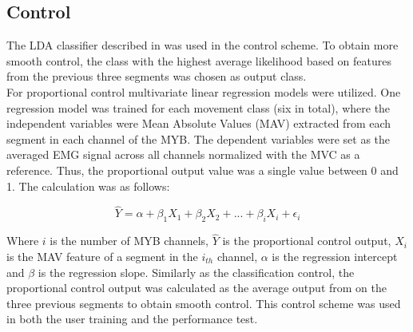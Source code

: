 \subsection{Control} \label{sub:P:control}
The LDA classifier described in  was used in the control scheme. To obtain more smooth control, the class with the highest average likelihood based on features from the previous three segments was chosen as output class. \\
For proportional control multivariate linear regression models were utilized. One regression model was trained for each movement class (six in total), where the independent variables were Mean Absolute Values (MAV) extracted from each segment in each channel of the MYB. The dependent variables were set as the averaged EMG signal across all channels normalized with the MVC as a reference. Thus, the proportional output value was a single value between 0 and 1. The calculation was as follows: 

\begin{equation} \label{eq:P:multiLinearRegression}
\hat{Y} = \alpha + \beta_1 X_{1} + \beta_2 X_{2} + ... + \beta_i X_{i} + \epsilon_i
\end{equation} 

Where $i$ is the number of MYB channels, $\hat{Y}$ is the proportional control output, $X_{i}$ is the MAV feature of a segment in the $i_{th}$ channel, $\alpha$ is the regression intercept and $\beta$ is the regression slope. Similarly as the classification control, the proportional control output was calculated as the average output from on the three previous segments to obtain smooth control. This control scheme was used in both the user training and the performance test.